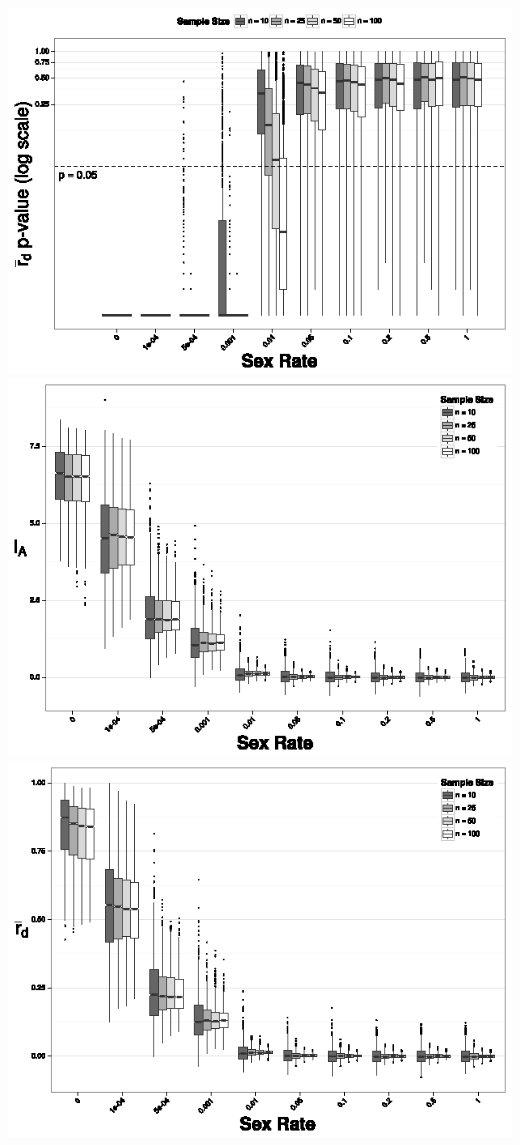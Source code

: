 \documentclass[letterpaper, 10pt]{article}
\begin{document}
\includegraphics{figures/rbarD_pval.eps}\\
\includegraphics{figures/Ia_chart2.eps}
\includegraphics{figures/rbarD_chart2.eps}\\
\end{document}
